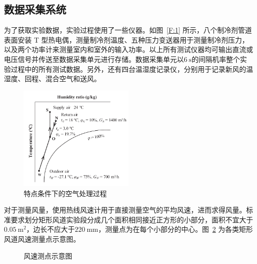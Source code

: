 \subsection{数据采集系统}
为了获取实验数据，实验过程使用了一些仪器。如图~\ref{F:1} 所示，八个制冷剂管道表面安装 T 型热电偶，测量制冷剂温度、五种压力变送器用于测量制冷剂压力，以及两个功率计来测量室内和室外的输入功率。以上所有测试仪器均可输出直流或电压信号并传送至数据采集单元进行存储。数据采集单元以$\qty{6}{\s} $的间隔机率整个实验过程中的所有测试数据。另外，还有四台温湿度记录仪，分别用于记录新风的温湿度、回程、混合空气和送风。

\begin{figure}[htbp]
	\centering
	\includegraphics[width=0.5\textwidth]{figure/figure_4}
	\caption{特点条件下的空气处理过程}
	\label{F:4}
\end{figure}

对于测量风量，使用热线风速计用于直接测量空气的平均风速，进而求得风量。标准要求划分矩形风道实验段分成几个面积相同接近正方形的小部分，面积不宜大于$\qty{0.05}{\m^2} $，边长不应大于$\qty{220}{\mm} $，测量点为在每个小部分的中心。图~\ref{F:5} 为各类矩形风道风速测量点示意图。

\begin{figure}[h]
\centering  %
\caption{风速测点示意图}
\label{F:5}
\end{figure}

